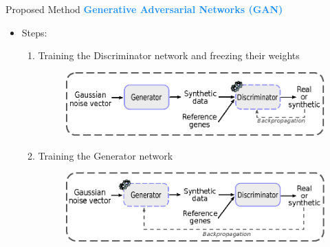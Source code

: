 \begin{frame}{Proposed Method}
    \Large\textcolor{dodgerblue}{\textbf{Generative Adversarial Networks (GAN)}}
    \normalsize
    \vspace{5pt}
    \begin{itemize}
        \item Steps:
        \vspace{3pt}
        \begin{enumerate}
            \item Training the Discriminator network and freezing their weights
            \vspace{3pt}
            \begin{figure}
                \centering
                  \includegraphics[scale=.8]{figures/training_step_1.eps}
            \end{figure}
            \item Training the Generator network
            \vspace{3pt}
            \begin{figure}
                \centering
                \includegraphics[scale=.8]{figures/training_step_2.eps}
            \end{figure}
        \end{enumerate}
    \end{itemize}

\end{frame}
